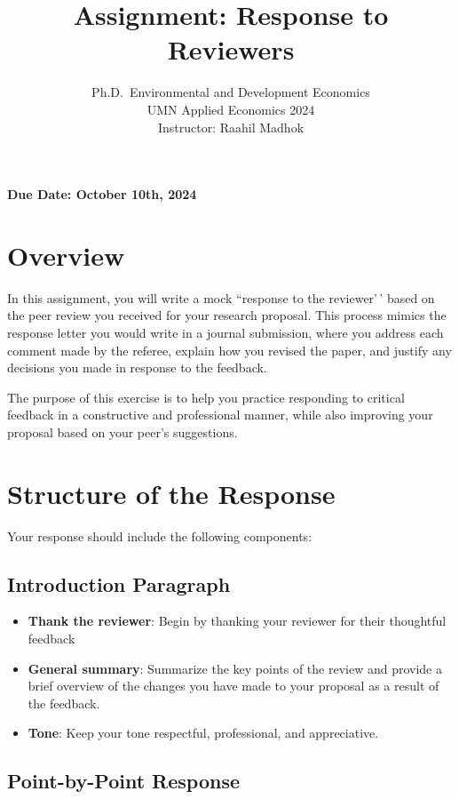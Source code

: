 \documentclass[
]{article}
\title{Assignment: Response to Reviewers}
\subtitle{Ph.D.~Environmental and Development Economics\\
UMN Applied Economics 2024\\
Instructor: Raahil Madhok}
\author{}
\date{\vspace{-2.5em}}
\providecommand{\tightlist}{%
  \setlength{\itemsep}{0pt}\setlength{\parskip}{0pt}}
\begin{document}
\maketitle

\textbf{Due Date: October 10th, 2024}

\hypertarget{overview}{%
\section{Overview}\label{overview}}

In this assignment, you will write a mock ``response to the reviewer'\,' based on the peer review you received for your research proposal. This process mimics the response letter you would write in a journal submission, where you address each comment made by the referee, explain how you revised the paper, and justify any decisions you made in response to the feedback.

The purpose of this exercise is to help you practice responding to critical feedback in a constructive and professional manner, while also improving your proposal based on your peer's suggestions.

\hypertarget{structure-of-the-response}{%
\section{Structure of the Response}\label{structure-of-the-response}}

Your response should include the following components:

\hypertarget{introduction-paragraph}{%
\subsection{Introduction Paragraph}\label{introduction-paragraph}}

\begin{itemize}
\tightlist
\item
  \textbf{Thank the reviewer}: Begin by thanking your reviewer for their thoughtful feedback
\item
  \textbf{General summary}: Summarize the key points of the review and provide a brief overview of the changes you have made to your proposal as a result of the feedback.
\item
  \textbf{Tone}: Keep your tone respectful, professional, and appreciative.
\end{itemize}

\hypertarget{point-by-point-response}{%
\subsection{Point-by-Point Response}\label{point-by-point-response}}
\end{document}
